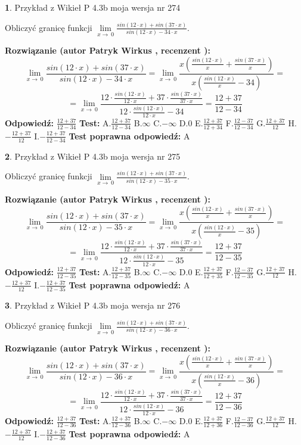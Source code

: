 \documentclass[12pt, a4paper]{article}
\theoremstyle{definition} %
\newtheorem{zad}{}
\newcommand{\zadStart}[1]{\begin{zad}#1\newline}
\newcommand{\zadStop}{\end{zad}}
\newcommand{\rozwStart}[2]{\noindent \textbf{Rozwiązanie (autor #1 , recenzent #2): }\newline}
\newcommand{\rozwStop}{\newline}
\newcommand{\odpStart}{\noindent \textbf{Odpowiedź:}\newline}
\newcommand{\odpStop}{\newline}
\newcommand{\testStart}{\noindent \textbf{Test:}\newline}
\newcommand{\testStop}{\newline}
\newcommand{\kluczStart}{\noindent \textbf{Test poprawna odpowiedź:}\newline}
\newcommand{\kluczStop}{\newline}
\begin{document}
\zadStart{Przykład z Wikieł P 4.3b moja wersja nr 274}


Obliczyć granicę funkcji $\lim\limits_{x\to\ 0}\frac{sin(12 \cdot x)+sin(37 \cdot x)}{sin(12 \cdot x)-34 \cdot x}$.
\zadStop
\rozwStart{Patryk Wirkus}{}
$$\lim\limits_{x\to\ 0}\frac{sin(12 \cdot x)+sin(37 \cdot x)}{sin(12 \cdot x)-34 \cdot x}=\lim\limits_{x\to\ 0}\frac{x(\frac{sin(12 \cdot x)}{x}+\frac{sin(37 \cdot x)}{x})}{x(\frac{sin(12 \cdot x)}{x}-34)}=$$
$$=\lim\limits_{x\to\ 0}\frac{12 \cdot \frac{sin(12 \cdot x)}{12 \cdot x}+37 \cdot \frac{sin(37 \cdot x)}{37 \cdot x}}{12 \cdot \frac{sin(12 \cdot x)}{12 \cdot x}-34}=\frac{12+37}{12-34}$$
\rozwStop
\odpStart
$\frac{12+37}{12-34}$
\odpStop
\testStart
A.$\frac{12+37}{12-34}$
B.$\infty$
C.$-\infty$
D.$0$
E.$\frac{12+37}{12+34}$
F.$\frac{12-37}{12-34}$
G.$\frac{12+37}{12}$
H.$-\frac{12+37}{12}$
I.$-\frac{12+37}{12-34}$
\testStop
\kluczStart
A
\kluczStop



\zadStart{Przykład z Wikieł P 4.3b moja wersja nr 275}


Obliczyć granicę funkcji $\lim\limits_{x\to\ 0}\frac{sin(12 \cdot x)+sin(37 \cdot x)}{sin(12 \cdot x)-35 \cdot x}$.
\zadStop
\rozwStart{Patryk Wirkus}{}
$$\lim\limits_{x\to\ 0}\frac{sin(12 \cdot x)+sin(37 \cdot x)}{sin(12 \cdot x)-35 \cdot x}=\lim\limits_{x\to\ 0}\frac{x(\frac{sin(12 \cdot x)}{x}+\frac{sin(37 \cdot x)}{x})}{x(\frac{sin(12 \cdot x)}{x}-35)}=$$
$$=\lim\limits_{x\to\ 0}\frac{12 \cdot \frac{sin(12 \cdot x)}{12 \cdot x}+37 \cdot \frac{sin(37 \cdot x)}{37 \cdot x}}{12 \cdot \frac{sin(12 \cdot x)}{12 \cdot x}-35}=\frac{12+37}{12-35}$$
\rozwStop
\odpStart
$\frac{12+37}{12-35}$
\odpStop
\testStart
A.$\frac{12+37}{12-35}$
B.$\infty$
C.$-\infty$
D.$0$
E.$\frac{12+37}{12+35}$
F.$\frac{12-37}{12-35}$
G.$\frac{12+37}{12}$
H.$-\frac{12+37}{12}$
I.$-\frac{12+37}{12-35}$
\testStop
\kluczStart
A
\kluczStop



\zadStart{Przykład z Wikieł P 4.3b moja wersja nr 276}


Obliczyć granicę funkcji $\lim\limits_{x\to\ 0}\frac{sin(12 \cdot x)+sin(37 \cdot x)}{sin(12 \cdot x)-36 \cdot x}$.
\zadStop
\rozwStart{Patryk Wirkus}{}
$$\lim\limits_{x\to\ 0}\frac{sin(12 \cdot x)+sin(37 \cdot x)}{sin(12 \cdot x)-36 \cdot x}=\lim\limits_{x\to\ 0}\frac{x(\frac{sin(12 \cdot x)}{x}+\frac{sin(37 \cdot x)}{x})}{x(\frac{sin(12 \cdot x)}{x}-36)}=$$
$$=\lim\limits_{x\to\ 0}\frac{12 \cdot \frac{sin(12 \cdot x)}{12 \cdot x}+37 \cdot \frac{sin(37 \cdot x)}{37 \cdot x}}{12 \cdot \frac{sin(12 \cdot x)}{12 \cdot x}-36}=\frac{12+37}{12-36}$$
\rozwStop
\odpStart
$\frac{12+37}{12-36}$
\odpStop
\testStart
A.$\frac{12+37}{12-36}$
B.$\infty$
C.$-\infty$
D.$0$
E.$\frac{12+37}{12+36}$
F.$\frac{12-37}{12-36}$
G.$\frac{12+37}{12}$
H.$-\frac{12+37}{12}$
I.$-\frac{12+37}{12-36}$
\testStop
\kluczStart
A
\kluczStop
\end{document}
